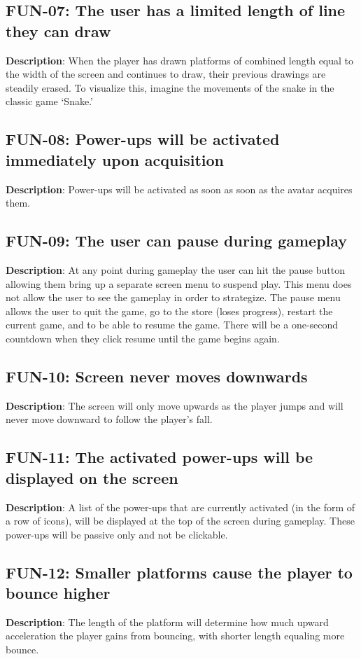 \subsection{FUN-07: The user has a limited length of line they can draw}
\textbf{Description}: When the player has drawn platforms of combined
length equal to the width of the screen and continues to draw, their previous
drawings are steadily erased. To visualize this, imagine the movements
of the snake in the classic game \textquoteleft{}Snake.\textquoteright{}

\subsection{FUN-08: Power-ups will be activated immediately upon acquisition }
\textbf{Description}: Power-ups will be activated as soon as soon
as the avatar acquires them.

\subsection{FUN-09: The user can pause during gameplay}
\textbf{Description}: At any point during gameplay the user can hit
the pause button allowing them bring up a separate screen menu to
suspend play. This menu does not allow the user to see the gameplay
in order to strategize. The pause menu allows the user to quit the
game, go to the store (loses progress), restart the current game,
and to be able to resume the game. There will be a one-second countdown
when they click resume until the game begins again.

\subsection{FUN-10: Screen never moves downwards}
\textbf{Description}: The screen will only move upwards as the player
jumps and will never move downward to follow the player\textquoteright{}s
fall.

\subsection{FUN-11: The activated power-ups will be displayed on the screen}
\textbf{Description}: A list of the power-ups that are currently activated
(in the form of a row of icons), will be displayed at the top of the
screen during gameplay. These power-ups will be passive only and not
be clickable.

\subsection{FUN-12: Smaller platforms cause the player to bounce higher}
\textbf{Description}: The length of the platform will determine how
much upward acceleration the player gains from bouncing, with shorter
length equaling more bounce.

